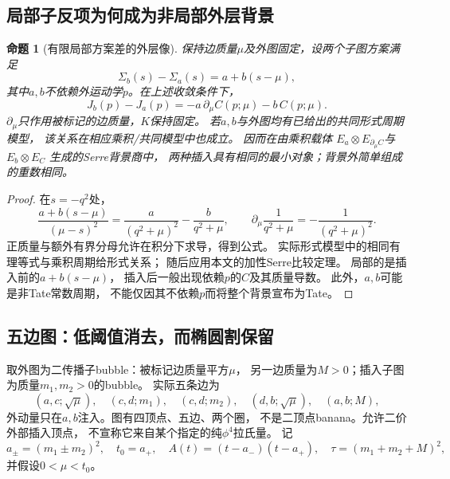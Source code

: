 \documentclass[11pt,a4paper]{ctexart}
\theoremstyle{cnplain}\newtheorem{theorem}{定理}[section]
\newtheorem{proposition}[theorem]{命题}
\theoremstyle{definition}\newtheorem{definition}[theorem]{定义}
\theoremstyle{remark}\newtheorem{remark}[theorem]{注}
\begin{document}
\subsection{局部子反项为何成为非局部外层背景}
\begin{proposition}[有限局部方案差的外层像]\label{prop:edgescheme}
保持边质量$\mu$及外图固定，设两个子图方案满足
\[
 \Sigma_b(s)-\Sigma_a(s)=a+b(s-\mu),
\]
其中$a,b$不依赖外运动学$p$。在上述收敛条件下，
\begin{equation}\label{eq:edgeschemediff}
 J_b(p)-J_a(p)
       =-a\,\partial_\mu C(p;\mu)-b\,C(p;\mu).
\end{equation}
$\partial_\mu$只作用被标记的边质量，$K$保持固定。
若$a,b$与外图均有已给出的共同形式周期模型，
该关系在相应乘积/共同模型中也成立。
因而在由乘积载体
$E_a\otimes E_{\partial_\mu C}$与$E_b\otimes E_C$
生成的Serre背景商中，
两种插入具有相同的最小对象；背景外简单组成的重数相同。
\end{proposition}
\begin{proof}
在$s=-q^2$处，
\[
 \frac{a+b(s-\mu)}{(\mu-s)^2}
   =\frac{a}{(q^2+\mu)^2}-\frac{b}{q^2+\mu},
 \qquad
 \partial_\mu\frac1{q^2+\mu}=-\frac1{(q^2+\mu)^2}.
\]
正质量与额外有界分母允许在积分下求导，得到公式。
实际形式模型中的相同有理等式与乘积周期给形式关系；
随后应用本文的加性Serre比较定理。
局部的是插入前的$a+b(s-\mu)$，
插入后一般出现依赖$p$的$C$及其质量导数。
此外，$a,b$可能是非Tate常数周期，
不能仅因其不依赖$p$而将整个背景宣布为Tate。
\end{proof}

\subsection{五边图：低阈值消去，而椭圆割保留}
取外图为二传播子bubble：被标记边质量平方$\mu$，
另一边质量为$M>0$；插入子图为质量$m_1,m_2>0$的bubble。
实际五条边为
\[
 (a,c;\sqrt\mu),\quad(c,d;m_1),\quad(c,d;m_2),\quad
 (d,b;\sqrt\mu),\quad(a,b;M),
\]
外动量只在$a,b$注入。图有四顶点、五边、两个圈，
不是二顶点banana。允许二价外部插入顶点，
不宣称它来自某个指定的纯$\phi^4$拉氏量。
记
\[
 a_\pm=(m_1\pm m_2)^2,\quad t_0=a_+,\quad
 A(t)=(t-a_-)(t-a_+),\quad
 \tau=(m_1+m_2+M)^2,
\]
并假设$0<\mu<t_0$。
\end{document}
